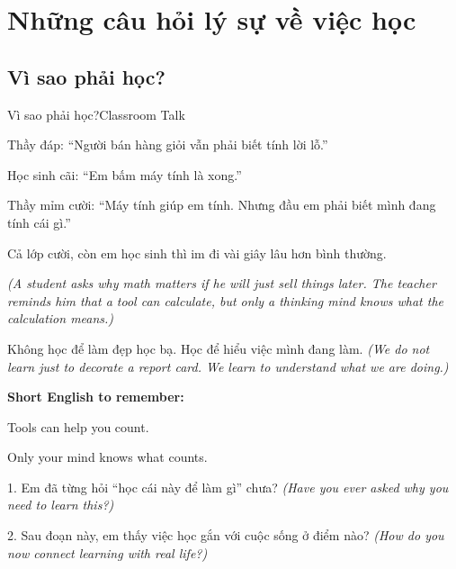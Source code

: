 \chapter{Những câu hỏi lý sự về việc học}

\section{Vì sao phải học?}
\begin{truyen}{Vì sao phải học?}{Classroom Talk}

Thầy đáp: ``Người bán hàng giỏi vẫn phải biết tính lời lỗ.''

Học sinh cãi: ``Em bấm máy tính là xong.''

Thầy mỉm cười: ``Máy tính giúp em tính. Nhưng đầu em phải biết mình đang tính cái gì.''

Cả lớp cười, còn em học sinh thì im đi vài giây lâu hơn bình thường.

\textit{(A student asks why math matters if he will just sell things later. The teacher reminds him that a tool can calculate, but only a thinking mind knows what the calculation means.)}
\end{truyen}

\begin{baihoc}
Không học để làm đẹp học bạ. Học để hiểu việc mình đang làm.
\textit{(We do not learn just to decorate a report card. We learn to understand what we are doing.)}
\end{baihoc}

\begin{ghinhoanh}
\textbf{Short English to remember:}

Tools can help you count.

Only your mind knows what counts.
\end{ghinhoanh}

\begin{tuhocnhanh}
1. Em đã từng hỏi ``học cái này để làm gì'' chưa? \textit{(Have you ever asked why you need to learn this?)}

2. Sau đoạn này, em thấy việc học gắn với cuộc sống ở điểm nào? \textit{(How do you now connect learning with real life?)}
\end{tuhocnhanh}
\ngancach

